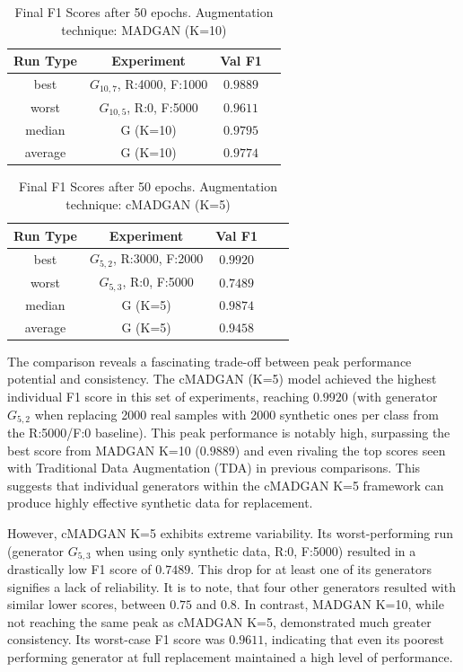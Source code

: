 \begin{table}[H]
	\vspace{-1.5em}
	\centering
	\begin{tabular}{|c|c|c|c|}
		\hline
		Run Type & Experiment & Val F1 \\ \hline
		best & \(G_{10, 7}\), R:4000, F:1000 & $0.9889$\\ \hline
		worst & \(G_{10, 5}\), R:0, F:5000 & $0.9611$\\ \hline
		median & G (K=10) & $0.9795$\\ \hline
		average & G (K=10) & $0.9774$
		\\ \hline
	\end{tabular}
    \caption{Final F1 Scores after 50 epochs. Augmentation technique: MADGAN (K=10)}
        \label{tab:res_replacement_mnist_cmadgan_vs_madgan__madgan}
\end{table}
\begin{table}[H]
	\centering
	\vspace{-1.5em}
	\begin{tabular}{|c|c|c|c|c|}
		\hline
		Run Type & Experiment & Val F1 \\ \hline
		best & \(G_{5, 2}\), R:3000, F:2000 & $0.9920$\\ \hline
		worst & \(G_{5, 3}\), R:0, F:5000 & $0.7489$\\ \hline
		median & G (K=5) & $0.9874$\\ \hline
		average & G (K=5) & $0.9458$
		\\ \hline
	\end{tabular}
    \caption{Final F1 Scores after 50 epochs. Augmentation technique: cMADGAN (K=5)}
        \label{tab:res_replacement_mnist_cmadgan_vs_madgan__cmadgan}
\end{table}
The comparison reveals a fascinating trade-off between peak performance potential and consistency. The cMADGAN (K=5) model achieved the highest individual F1 score in this set of experiments, reaching $0.9920$ (with generator \(G_{5,2}\) when replacing 2000 real samples with 2000 synthetic ones per class from the R:5000/F:0 baseline). This peak performance is notably high, surpassing the best score from MADGAN K=10 ($0.9889$) and even rivaling the top scores seen with Traditional Data Augmentation (TDA) in previous comparisons. This suggests that individual generators within the cMADGAN K=5 framework can produce highly effective synthetic data for replacement.

However, cMADGAN K=5 exhibits extreme variability. Its worst-performing run (generator \(G_{5,3}\) when using only synthetic data, R:0, F:5000) resulted in a drastically low F1 score of $0.7489$. This drop for at least one of its generators signifies a lack of reliability. It is to note, that four other generators resulted with similar lower scores, between $0.75$ and $0.8$. In contrast, MADGAN K=10, while not reaching the same peak as cMADGAN K=5, demonstrated much greater consistency. Its worst-case F1 score was $0.9611$, indicating that even its poorest performing generator at full replacement maintained a high level of performance.

